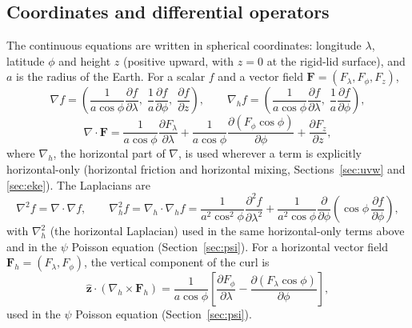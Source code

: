 \documentclass{article}
\begin{document}
\subsection{Coordinates and differential operators}\label{sec:coords}
The continuous equations are written in spherical coordinates: longitude $\lambda$, latitude $\phi$ and height $z$ (positive upward, with $z=0$ at the rigid-lid surface), and $a$ is the radius of the Earth. For a scalar $f$ and a vector field $\mathbf{F} = (F_\lambda, F_\phi, F_z)$,
\[
\nabla f = \left( \frac{1}{a\cos\phi}\frac{\partial f}{\partial\lambda},\; \frac{1}{a}\frac{\partial f}{\partial\phi},\; \frac{\partial f}{\partial z} \right),
\qquad
\nabla_h f = \left( \frac{1}{a\cos\phi}\frac{\partial f}{\partial\lambda},\; \frac{1}{a}\frac{\partial f}{\partial\phi} \right),
\]
\[
\nabla\cdot\mathbf{F} = \frac{1}{a\cos\phi}\frac{\partial F_\lambda}{\partial\lambda} + \frac{1}{a\cos\phi}\frac{\partial(F_\phi\cos\phi)}{\partial\phi} + \frac{\partial F_z}{\partial z},
\]
where $\nabla_h$, the horizontal part of $\nabla$, is used wherever a term is explicitly horizontal-only (horizontal friction and horizontal mixing, Sections~\ref{sec:uvw} and \ref{sec:eke}). The Laplacians are
\[
\nabla^2 f = \nabla\cdot\nabla f,
\qquad
\nabla_h^2 f = \nabla_h\cdot\nabla_h f = \frac{1}{a^2\cos^2\phi}\frac{\partial^2 f}{\partial\lambda^2} + \frac{1}{a^2\cos\phi}\frac{\partial}{\partial\phi}\!\left(\cos\phi\,\frac{\partial f}{\partial\phi}\right),
\]
with $\nabla_h^2$ (the horizontal Laplacian) used in the same horizontal-only terms above and in the $\psi$ Poisson equation (Section~\ref{sec:psi}). For a horizontal vector field $\mathbf{F}_h = (F_\lambda, F_\phi)$, the vertical component of the curl is
\[
\hat{\mathbf{z}}\cdot(\nabla_h\times\mathbf{F}_h) = \frac{1}{a\cos\phi}\left[ \frac{\partial F_\phi}{\partial\lambda} - \frac{\partial (F_\lambda\cos\phi)}{\partial\phi} \right],
\]
used in the $\psi$ Poisson equation (Section~\ref{sec:psi}).
\end{document}
